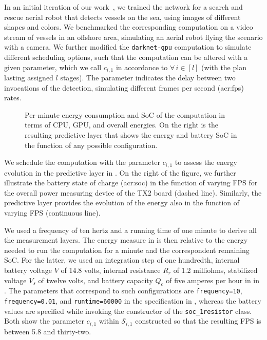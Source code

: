 In an initial iteration of our work~\citep{teamplayd43}, we trained the network for a search and rescue aerial robot that detects vessels on the sea, using images of different shapes and colors. We benchmarked the corresponding computation on a video stream of vessels in an offshore area, simulating an aerial robot flying the scenario with a camera. We further modified the {\small\tt darknet-gpu} computation to simulate different scheduling options, such that the computation can be altered with a given parameter, which we call $c_{i,1}$ in accordance to  $\forall\,i\in[l]$  (with the plan lasting assigned $l$ stages). The parameter indicates the delay between two invocations of the detection, simulating different frames per second (\Gls{acr:fps}) rates. 
\begin{figure}[h!]
  \centering
  \selectfont
  
  \caption[Per-minute energy consumption and SoC of the  computation]{Per-minute energy consumption and SoC of the  computation in terms of CPU, GPU, and overall energies. On the right is the resulting predictive layer that shows the energy and battery SoC in the function of any possible configuration.}
  \label{fig:darknet-layer2}
\end{figure}
We schedule the computation with the parameter $c_{i,1}$ to assess the energy evolution in the predictive layer in . On the right of the figure, we further illustrate the battery state of charge (\Gls{acr:soc}) in the function of varying FPS for the overall power measuring device of the TX2 board (dashed line). Similarly, the predictive layer provides the evolution of the energy also in the function of varying FPS (continuous line).

We used a frequency of ten hertz and a running time of one minute to derive all the measurement layers. The energy measure in  is then relative to the energy needed to run the computation for a minute and the correspondent remaining SoC. For the latter, we used an integration step of one hundredth, internal battery voltage $V$ of 14.8 volts, internal resistance $R_r$ of 1.2 milliohms, stabilized voltage $V_s$ of twelve volts, and battery capacity $Q_c$ of five amperes per hour in  in . The parameters that correspond to such configurations are {\small\tt frequency=10}, {\small\tt frequency=0.01}, and {\small\tt runtime=60000} in the specification in , whereas the battery values are specified while invoking the constructor of the {\small\tt soc\_1resistor} class. Both  show the parameter $c_{i,1}$ within $\mathcal{S}_{i,1}$ constructed so that the resulting FPS is between 5.8 and thirty-two.

